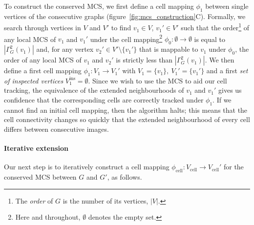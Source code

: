 \documentclass[a4paper,11pt]{article}
\begin{document}
To construct the conserved MCS, we first define a cell mapping $\phi_{1}$ between single vertices of the consecutive graphs (figure~\ref{fig:mcs_construction}C). 
Formally, we search through vertices in $V$ and $V'$ to find $v_{1} \in V$, $v_{1}' \in V'$ such that the order\footnote{The \textit{order} of $G$ is the number of its vertices, $|V|$.} of any local MCS of $v_{1}$ and $v_{1}'$ under the cell mapping\footnote{Here and throughout, $\emptyset$ denotes the empty set.} $\phi_{0} : \emptyset \rightarrow \emptyset$ is equal to $|\Gamma_G^{2}(v_{1})|$ and, for any vertex $v_2' \in V' \setminus \{ v_1' \}$ that is mappable to $v_{1}$ under $\phi_{0}$, the order of any local MCS of $v_{1}$ and $v_{2}'$ is strictly less than $|\Gamma_G^{2}(v_{1})|$.
We then define a first cell mapping $\phi_{1} : V_{1} \rightarrow V_{1}'$ with $V_{1} = \{ v_1 \},~V_{1}' = \{ v_1' \}$ and a first \textit{set of inspected vertices} $V^\mathrm{ins}_{1} = \emptyset$. 
Since we wish to use the MCS to aid our cell tracking, the equivalence of the extended neighbourhoods of $v_{1}$ and $v_1'$ gives us confidence that the corresponding cells are correctly tracked under $\phi_{1}$. 
If we cannot find an initial cell mapping, then the algorithm halts; this means that the cell connectivity changes so quickly that the extended neighbourhood of every cell differs between consecutive images.


\paragraph{Iterative extension}

Our next step is to iteratively construct a cell mapping $\phi_{\mathrm{cell}} : V_{\mathrm{cell}} \rightarrow V_{\mathrm{cell}}'$ for the conserved MCS between $G$ and $G'$, as follows.
\end{document}
